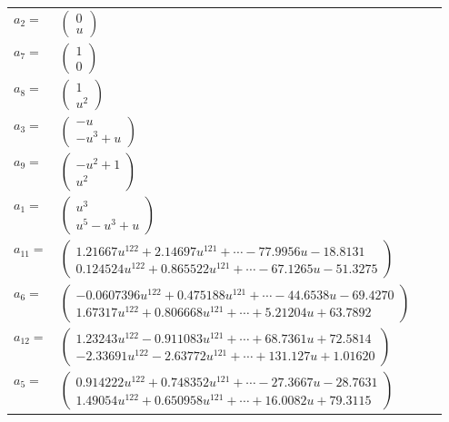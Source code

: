 \documentclass[1p]{elsarticle_modified}
\theoremstyle{definition}
\begin{document}
\begin{tabular}{m{7pt} m{180pt} m{7pt} m{180pt} }
\flushright $a_{2}=$&$\begin{pmatrix}0\\u\end{pmatrix}$ \\
\flushright $a_{7}=$&$\begin{pmatrix}1\\0\end{pmatrix}$ \\
\flushright $a_{8}=$&$\begin{pmatrix}1\\u^2\end{pmatrix}$ \\
\flushright $a_{3}=$&$\begin{pmatrix}- u\\- u^3+u\end{pmatrix}$ \\
\flushright $a_{9}=$&$\begin{pmatrix}- u^2+1\\u^2\end{pmatrix}$ \\
\flushright $a_{1}=$&$\begin{pmatrix}u^3\\u^5- u^3+u\end{pmatrix}$ \\
\flushright $a_{11}=$&$\begin{pmatrix}1.21667 u^{122}+2.14697 u^{121}+\cdots-77.9956 u-18.8131\\0.124524 u^{122}+0.865522 u^{121}+\cdots-67.1265 u-51.3275\end{pmatrix}$ \\
\flushright $a_{6}=$&$\begin{pmatrix}-0.0607396 u^{122}+0.475188 u^{121}+\cdots-44.6538 u-69.4270\\1.67317 u^{122}+0.806668 u^{121}+\cdots+5.21204 u+63.7892\end{pmatrix}$ \\
\flushright $a_{12}=$&$\begin{pmatrix}1.23243 u^{122}-0.911083 u^{121}+\cdots+68.7361 u+72.5814\\-2.33691 u^{122}-2.63772 u^{121}+\cdots+131.127 u+1.01620\end{pmatrix}$ \\
\flushright $a_{5}=$&$\begin{pmatrix}0.914222 u^{122}+0.748352 u^{121}+\cdots-27.3667 u-28.7631\\1.49054 u^{122}+0.650958 u^{121}+\cdots+16.0082 u+79.3115\end{pmatrix}$ \\

\end{tabular}
\end{document}
